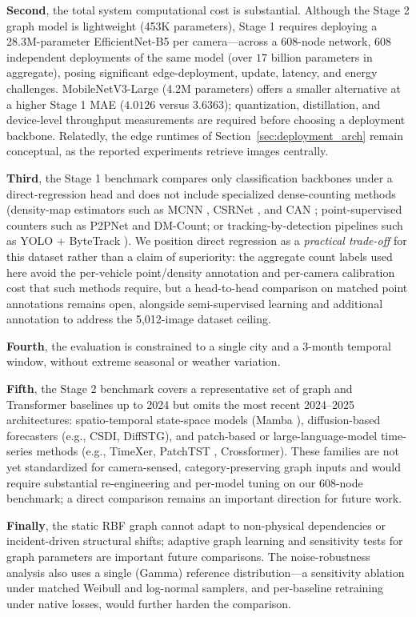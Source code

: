 \documentclass[preprint,12pt]{elsarticle}
\begin{document}
\textbf{Second}, the total system computational cost is substantial. Although the Stage 2 graph model is lightweight (453K parameters), Stage 1 requires deploying a 28.3M-parameter EfficientNet-B5 per camera---across a 608-node network, 608 independent deployments of the same model (over $17$ billion parameters in aggregate), posing significant edge-deployment, update, latency, and energy challenges. MobileNetV3-Large (4.2M parameters) offers a smaller alternative at a higher Stage 1 MAE ($4.0126$ versus $3.6363$); quantization, distillation, and device-level throughput measurements are required before choosing a deployment backbone. Relatedly, the edge runtimes of Section~\ref{sec:deployment_arch} remain conceptual, as the reported experiments retrieve images centrally.

\textbf{Third}, the Stage 1 benchmark compares only classification backbones under a direct-regression head and does not include specialized dense-counting methods (density-map estimators such as MCNN \citep{mcnn}, CSRNet \citep{csrnet}, and CAN \citep{can}; point-supervised counters such as P2PNet and DM-Count; or tracking-by-detection pipelines such as YOLO + ByteTrack \citep{yolo}). We position direct regression as a \emph{practical trade-off} for this dataset rather than a claim of superiority: the aggregate count labels used here avoid the per-vehicle point/density annotation and per-camera calibration cost that such methods require, but a head-to-head comparison on matched point annotations remains open, alongside semi-supervised learning and additional annotation to address the 5,012-image dataset ceiling.

\textbf{Fourth}, the evaluation is constrained to a single city and a 3-month temporal window, without extreme seasonal or weather variation.

\textbf{Fifth}, the Stage 2 benchmark covers a representative set of graph and Transformer baselines up to 2024 but omits the most recent 2024--2025 architectures: spatio-temporal state-space models (Mamba \citep{mamba}), diffusion-based forecasters (e.g., CSDI, DiffSTG), and patch-based or large-language-model time-series methods (e.g., TimeXer, PatchTST \citep{patchtst}, Crossformer). These families are not yet standardized for camera-sensed, category-preserving graph inputs and would require substantial re-engineering and per-model tuning on our 608-node benchmark; a direct comparison remains an important direction for future work.

\textbf{Finally}, the static RBF graph cannot adapt to non-physical dependencies or incident-driven structural shifts; adaptive graph learning and sensitivity tests for graph parameters are important future comparisons. The noise-robustness analysis also uses a single (Gamma) reference distribution---a sensitivity ablation under matched Weibull and log-normal samplers, and per-baseline retraining under native losses, would further harden the comparison.
\end{document}
